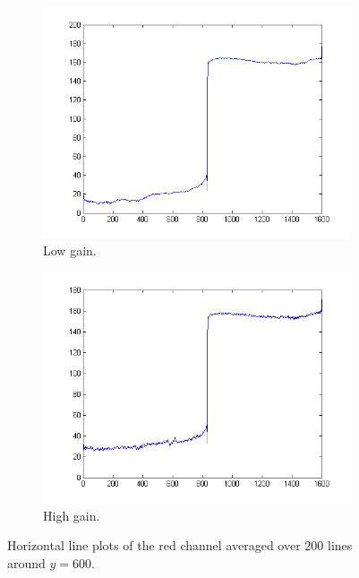 \documentclass[a4paper, 12pt]{paper}
\begin{document}
\begin{figure}[H]
    \centering
    \begin{subfigure}[b]{0.47\textwidth}
        \includegraphics[width=\textwidth]{img/plot_contrast_no_gain_avg}
        \caption{Low gain.}
    \end{subfigure}
    \begin{subfigure}[b]{0.47\textwidth}
        \includegraphics[width=\textwidth]{img/plot_contrast_max_gain_avg}
        \caption{High gain.}
    \end{subfigure}
    \caption{Horizontal line plots of the red channel averaged over 200 lines around $y = 600$.}
\label{fig:step}
\end{figure}
\end{document}
